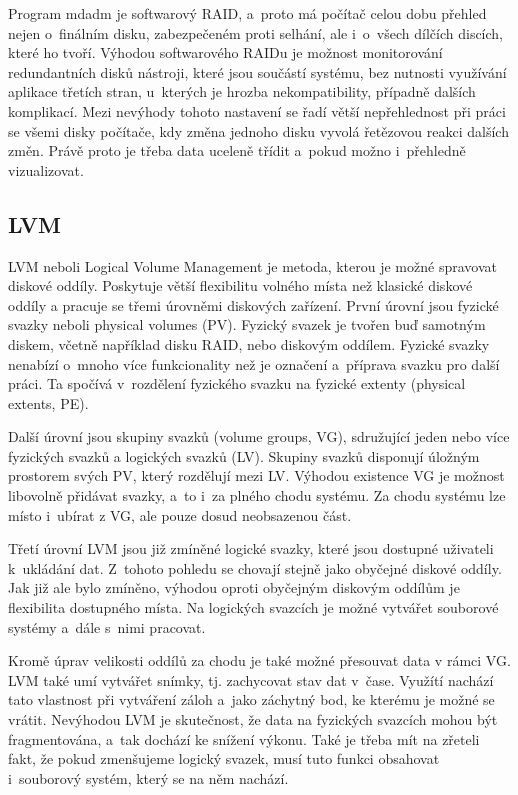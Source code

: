 \documentclass[color,table,oneside,nolot,nolof]{fithesis}
\begin{document}
	Program mdadm je softwarový RAID, a~proto má počítač celou dobu přehled nejen o~finálním disku, zabezpečeném proti selhání, ale i~o~všech dílčích discích, které ho tvoří. Výhodou
	softwarového RAIDu je
	možnost monitorování redundantních disků nástroji, které jsou součástí systému, bez nutnosti využívání aplikace třetích stran, u~kterých je hrozba nekompatibility, případně dalších 
	komplikací.
	Mezi nevýhody tohoto nastavení se řadí větší nepřehlednost při práci se všemi disky počítače, kdy změna jednoho disku vyvolá řetězovou reakci dalších změn. Právě proto je třeba data uceleně třídit
	a~pokud možno i~přehledně vizualizovat.

\subsection{LVM}
  LVM neboli Logical Volume Management je metoda, kterou je možné spravovat diskové oddíly. Poskytuje větší flexibilitu volného místa než klasické diskové oddíly a pracuje se třemi
	úrovněmi
	diskových zařízení. První úrovní jsou fyzické svazky neboli physical volumes (PV). Fyzický svazek je tvořen buď samotným diskem, včetně například disku RAID, nebo diskovým oddílem. 
	Fyzické
	svazky nenabízí o~mnoho více funkcionality než je označení a~příprava svazku pro další práci. Ta spočívá v~rozdělení fyzického svazku na fyzické extenty (physical extents, PE).

	Další úrovní jsou skupiny svazků (volume groups, VG), sdružující jeden nebo více fyzických svazků a logických svazků (LV). Skupiny svazků disponují úložným prostorem svých PV, 
	který rozdělují mezi LV. Výhodou existence VG je možnost libovolně přidávat svazky, a~to i~za plného chodu systému. Za chodu systému lze místo i~ubírat z VG, ale 
	pouze dosud neobsazenou část. 

	Třetí úrovní LVM jsou již zmíněné logické svazky, které jsou dostupné uživateli k~ukládání dat. Z~tohoto pohledu se chovají stejně jako obyčejné diskové oddíly. Jak již ale
	bylo zmíněno, výhodou oproti obyčejným diskovým oddílům je flexibilita dostupného místa. Na logických svazcích je možné vytvářet souborové systémy a~dále s~nimi pracovat.

	Kromě úprav velikosti oddílů za chodu je také možné přesouvat data v rámci VG. LVM také umí vytvářet snímky, tj. zachycovat stav dat v~čase. Využítí nachází tato 
	vlastnost
	při vytváření záloh a~jako záchytný bod, ke kterému je možné se vrátit. Nevýhodou LVM je skutečnost, že data na fyzických svazcích mohou být fragmentována, a~tak
	dochází ke snížení výkonu. Také je třeba mít na zřeteli fakt, že pokud zmenšujeme logický svazek, musí tuto funkci obsahovat i~souborový systém, který se na něm nachází.
\end{document}
